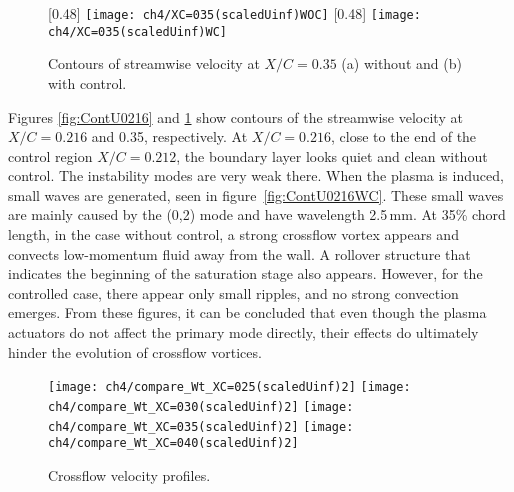 \begin{figure}
\centering
\subcaptionbox{\label{fig:ContU0350WOC}}[0.48\linewidth]{           %
\texttt{[image: ch4/XC=035(scaledUinf)WOC]}}
\subcaptionbox{\label{fig:ContU0350WC}}[0.48\linewidth]{
\texttt{[image: ch4/XC=035(scaledUinf)WC]}}
\caption{Contours of streamwise velocity at $X/C=0.35$ (a) without  and (b) with control.}
\label{fig:ContU0350} %
\end{figure}
Figures \ref{fig:ContU0216} and \ref{fig:ContU0350} show  contours of the streamwise velocity at $X/C=0.216$ and 0.35, respectively. At $X/C=0.216$, close to the end of the control region $X/C=0.212$, the boundary layer looks quiet and clean without control. The instability modes are very weak there. When the plasma is induced, small waves are generated, seen in figure~\ref{fig:ContU0216WC}. These small waves are mainly caused by the  (0,2) mode and have  wavelength  2.5\,mm. At 35\% chord length, in the case without control, a strong crossflow vortex appears and  convects low-momentum fluid away from the wall. A rollover structure that indicates the beginning of the saturation stage also appears. However, for the controlled case, there appear only small ripples, and no strong convection emerges. From these figures, it can be concluded that even though the plasma actuators do not affect the primary mode directly, their effects do ultimately hinder the evolution of crossflow vortices.
\begin{figure}
\centering
\texttt{[image: ch4/compare\_Wt\_XC=025(scaledUinf)2]}
\texttt{[image: ch4/compare\_Wt\_XC=030(scaledUinf)2]}
\texttt{[image: ch4/compare\_Wt\_XC=035(scaledUinf)2]}
\texttt{[image: ch4/compare\_Wt\_XC=040(scaledUinf)2]}
\caption{Crossflow velocity profiles.}%
\label{f:CFprofiles}
\end{figure}

